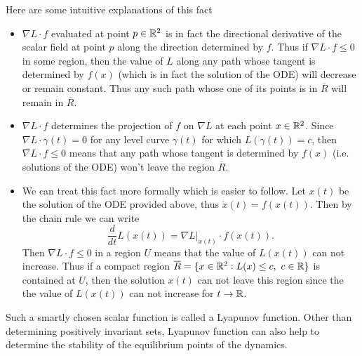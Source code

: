 Here are some intuitive explanations of this fact
\begin{itemize}
	\item $\nabla L \cdot f$ evaluated at point $p\in\mathbb{R}^2$ is in fact the directional derivative of the scalar field at point $p$ along the direction determined by $f$. Thus if $\nabla L \cdot f\leq 0$ in some region, then the value of $L$ along any path whose tangent is determined by $f(x)$ (which is in fact the solution of the ODE) will decrease or remain constant. Thus any such path whose one of its points is in $\overline{R}$ will remain in $\overline{R}$.
	
	\item $\nabla L \cdot f$ determines the projection of $f$ on $\nabla L$ at each point $x\in\mathbb{R}^2$. Since $\nabla L \cdot \gamma(t)=0$ for any level curve $\gamma(t)$ for which $L(\gamma(t)) = c$, then $\nabla L \cdot f \leq 0$ means that any path whose tangent is determined by $f(x)$ (i.e. solutions of the ODE) won't leave the region $\overline{R}$.
	
	\item We can treat this fact more formally which is easier to follow. Let $x(t)$ be the solution of the ODE provided above, thus $\dot{x}(t) = f(x(t))$. Then by the chain rule we can write
	\[ \frac{d}{dt} L(x(t)) = \nabla L \big|_{x(t)} \cdot f(x(t)).  \]
	Then $\nabla L \cdot f \leq 0$ in a region $U$ means that the value of $L(x(t))$ can not increase. Thus if a compact region $\overline{R} = \{ x\in\mathbb{R}^2: L(x)\leq c,\ c\in\mathbb{R} \}$ is contained at $U$, then the solution $x(t)$ can not leave this region since the the value of $L(x(t))$ can not increase for $t\to\mathbb{R}$.
\end{itemize}

Such a smartly chosen scalar function is called a Lyapunov function. Other than determining positively invariant sets, Lyapunov function can also help to determine the stability of the equilibrium points of the dynamics.

